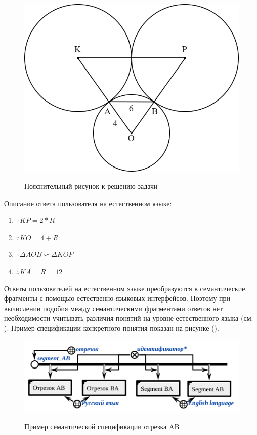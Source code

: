 \begin{figure}[H]
	\caption{Пояснительный рисунок к решению задачи}
	\includegraphics[scale=0.3]{author/part7/figures/explanatory_illustration_example.png}
	\label{fig:EI_example}
\end{figure}

Описание ответа пользователя на естественном языке:

\begin{enumerate}
	\item $\because KP = 2*R$
	\item $\because KO = 4+R$
	\item $\therefore \Delta A O B\backsim \Delta K O P$
	\item $\therefore K A = R = 12$
\end{enumerate}

Ответы пользователей на естественном языке преобразуются в семантические фрагменты с помощью естественно-языковых интерфейсов. Поэтому при вычислении подобия между семантическими фрагментами ответов нет необходимости учитывать различия понятий на уровне естественного языка (см. ). Пример спецификации конкретного понятия показан на рисунке (\textit{}).

\begin{figure}[H]
	\caption{Пример семантической спецификации отрезка AB}
	\includegraphics[scale=0.8]{author/part7/figures/specification_segment_example.png}
	\label{fig:SSE_example}
\end{figure}

